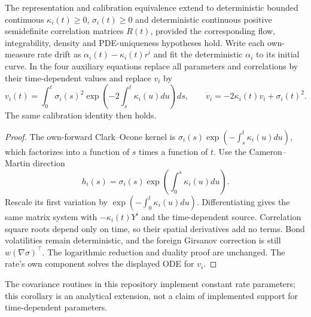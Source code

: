 \begin{cor}
The representation and calibration equivalence extend to deterministic bounded
continuous $\kappa_i(t)\geq0$, $\sigma_i(t)\geq0$ and deterministic continuous
positive semidefinite correlation matrices $R(t)$, provided the corresponding
flow, integrability, density and PDE-uniqueness hypotheses hold. Write each
own-measure rate drift as $\alpha_i(t)-\kappa_i(t)r^i$ and fit the deterministic
$\alpha_i$ to its initial curve. In the four auxiliary equations replace all
parameters and correlations by their time-dependent values and replace $v_i$ by
\[
v_i(t)=\int_0^t\sigma_i(s)^2
          \exp\left(-2\int_s^t\kappa_i(u)du\right)ds,
\qquad \dot v_i=-2\kappa_i(t)v_i+\sigma_i(t)^2.
\]
The same calibration identity then holds.
\end{cor}
\begin{proof}
The own-forward Clark--Ocone kernel is
$\sigma_i(s)\exp(-\int_s^t\kappa_i(u)du)$, which factorizes into a function
of $s$ times a function of $t$. Use the Cameron--Martin direction
\[
h_i(s)=\sigma_i(s)\exp\left(\int_0^s\kappa_i(u)du\right).
\]
Rescale its first variation by $\exp(-\int_0^t\kappa_i(u)du)$.
Differentiating gives the same
matrix system with $-\kappa_i(t)Y^i$ and the time-dependent source. Correlation
square roots depend only on time, so their spatial derivatives add no terms.
Bond volatilities remain deterministic, and the foreign Girsanov correction
is still $w(\nabla\sigma)^\top$. The logarithmic reduction and duality proof
are unchanged. The rate's own component solves the displayed ODE for $v_i$.
\end{proof}
The covariance routines in this repository implement constant rate parameters;
this corollary is an analytical extension, not a claim of implemented support
for time-dependent parameters.

